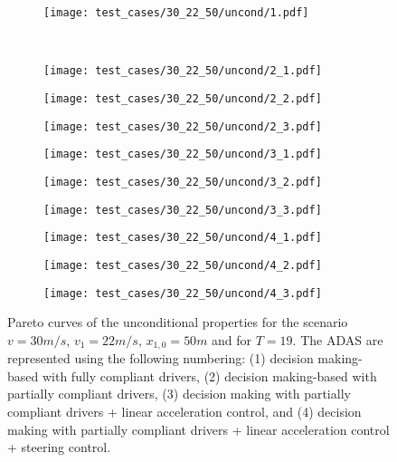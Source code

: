 \begin{figure}[H]
\centering
\begin{subfigure}{0.32\textwidth}
  \centering
  \texttt{[image: test\_cases/30\_22\_50/uncond/1.pdf]}
\end{subfigure}\\
\begin{subfigure}{0.32\textwidth}
  \centering
  \texttt{[image: test\_cases/30\_22\_50/uncond/2\_1.pdf]}
\end{subfigure} 
\begin{subfigure}{0.32\textwidth}
  \centering
  \texttt{[image: test\_cases/30\_22\_50/uncond/2\_2.pdf]}
\end{subfigure}
\begin{subfigure}{0.32\textwidth}
  \centering
  \texttt{[image: test\_cases/30\_22\_50/uncond/2\_3.pdf]}
\end{subfigure}
\begin{subfigure}{0.32\textwidth}
  \centering
  \texttt{[image: test\_cases/30\_22\_50/uncond/3\_1.pdf]}
\end{subfigure}
\begin{subfigure}{0.32\textwidth}
  \centering
  \texttt{[image: test\_cases/30\_22\_50/uncond/3\_2.pdf]}
\end{subfigure}
\begin{subfigure}{0.32\textwidth}
  \centering
  \texttt{[image: test\_cases/30\_22\_50/uncond/3\_3.pdf]}
\end{subfigure}
\begin{subfigure}{0.32\textwidth}
  \centering
  \texttt{[image: test\_cases/30\_22\_50/uncond/4\_1.pdf]}
\end{subfigure} 
\begin{subfigure}{0.32\textwidth}
  \centering
  \texttt{[image: test\_cases/30\_22\_50/uncond/4\_2.pdf]}
\end{subfigure}
\begin{subfigure}{0.32\textwidth}
  \centering
  \texttt{[image: test\_cases/30\_22\_50/uncond/4\_3.pdf]}
\end{subfigure}
\caption{Pareto curves of the unconditional properties for the scenario $v = 30m/s$, $v_1 = 22m/s$, $x_{1,0} = 50m$ and for $T = 19$. The ADAS are represented using the following numbering: (1) decision making-based with fully compliant drivers, (2) decision making-based with partially compliant drivers, (3) decision making with partially compliant drivers + linear acceleration control, and (4) decision making with partially compliant drivers + linear acceleration control + steering control.}
\label{fig:test_case_2_uncond}
\end{figure}


